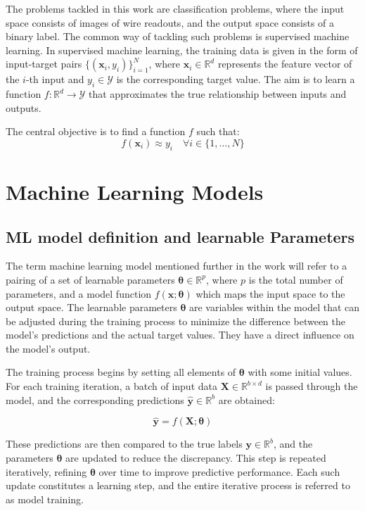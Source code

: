 \documentclass{pracalicmgr}
\begin{document}
The problems tackled in this work are classification problems, where the input space consists of images of wire readouts, and the output space consists of a binary label. The common way of tackling such problems is supervised machine learning.
In supervised machine learning, the training data is given in the form of input-target pairs \( \{(\mathbf{x}_i, y_i)\}_{i=1}^N \), where \( \mathbf{x}_i \in \mathbb{R}^d \) represents the feature vector of the \( i \)-th input and \( y_i \in \mathcal{Y} \) is the corresponding target value. The aim is to learn a function \( f: \mathbb{R}^d \rightarrow \mathcal{Y} \) that approximates the true relationship between inputs and outputs.

The central objective is to find a function \( f \) such that:
\[
f(\mathbf{x}_i) \approx y_i \quad \forall i \in \{1, \dots, N\}
\]

\section{Machine Learning Models}

\subsection{ML model definition and learnable Parameters}

The term machine learning model mentioned further in the work will refer to a pairing of a set of learnable parameters \( \boldsymbol{\theta} \in \mathbb{R}^p \), where \( p \) is the total number of parameters, and a model function \( f(\mathbf{x}; \boldsymbol{\theta}) \) which maps the input space to the output space. The learnable parameters \( \boldsymbol{\theta} \) are variables within the model that can be adjusted during the training process to minimize the difference between the model's predictions and the actual target values. They have a direct influence on the model's output.


The training process begins by setting all elements of \( \boldsymbol{\theta} \) with some initial values. For each training iteration, a batch of input data \( \mathbf{X} \in \mathbb{R}^{b \times d} \) is passed through the model, and the corresponding predictions \( \hat{\mathbf{y}} \in \mathbb{R}^b \) are obtained:

\[
\hat{\mathbf{y}} = f(\mathbf{X}; \boldsymbol{\theta})
\]

These predictions are then compared to the true labels \( \mathbf{y} \in \mathbb{R}^b \), and the parameters \( \boldsymbol{\theta} \) are updated to reduce the discrepancy. This step is repeated iteratively, refining \( \boldsymbol{\theta} \) over time to improve predictive performance. Each such update constitutes a learning step, and the entire iterative process is referred to as model training.
\end{document}
